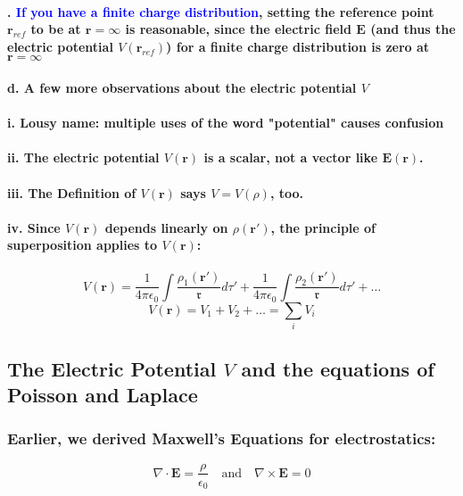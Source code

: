 \documentclass{article}
\begin{document}
\paragraph{. \textcolor{blue}{If you have a finite charge distribution}, setting the reference point $\boldsymbol{r}_{ref}$ to be at $\boldsymbol{r}=\infty$ is reasonable, since the electric field $\boldsymbol{E}$ (and thus the electric potential $V(\boldsymbol{r}_{ref})$) for a finite charge distribution is zero at $\boldsymbol{r}=\infty$}
\paragraph{d. A few more observations about the electric potential $V$}
\paragraph{\indent i. Lousy name: multiple uses of the word "potential" causes confusion}
\paragraph{\indent ii. The electric potential $V(\boldsymbol{r})$ is a scalar, not a vector like $\boldsymbol{E(r)}$.}
\paragraph{\indent iii. The Definition of $V(\boldsymbol{r})$ says $V=V(\rho)$, too.}
\paragraph{\indent iv. Since $V(\boldsymbol{r})$ depends linearly on $\rho(\boldsymbol{r'})$, the principle of superposition applies to $V(\boldsymbol{r})$:}
\begin{equation*}
    V(\boldsymbol{r})=\frac{1}{4\pi\epsilon_0}\int\frac{\rho_1(\boldsymbol{r'})}{\mathfrak{r}}d\tau'+\frac{1}{4\pi\epsilon_0}\int\frac{\rho_2(\boldsymbol{r'})}{\mathfrak{r}}d\tau'+\dots
\end{equation*}
\begin{equation*}
    V(\boldsymbol{r})=V_1+V_2+\dots=\sum_iV_i
\end{equation*}
\subsection{The Electric Potential $V$ and the equations of Poisson and Laplace}
\subsubsection{Earlier, we derived Maxwell's Equations for electrostatics:}
\begin{equation*}
    \nabla \cdot \boldsymbol{E}=\frac{\rho}{\epsilon_0} \quad \text{and}\quad \nabla \times\boldsymbol{E}=0
\end{equation*}
\end{document}
